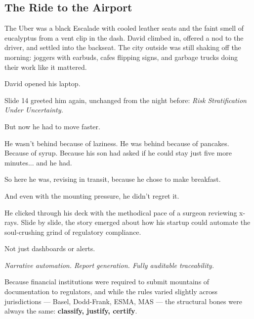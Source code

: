 
\subsection{The Ride to the Airport}

The Uber was a black Escalade with cooled leather seats and the faint smell of eucalyptus from a vent 
clip in the dash. David climbed in, offered a nod to the driver, and settled into the backseat. The 
city outside was still shaking off the morning: joggers with earbuds, cafes flipping signs, and garbage 
trucks doing their work like it mattered.

David opened his laptop.

Slide 14 greeted him again, unchanged from the night before:
\textit{Risk Stratification Under Uncertainty.}

But now he had to move faster.

He wasn’t behind because of laziness. He was behind because of pancakes. Because of syrup. 
Because his son had asked if he could stay just five more minutes... and he had.

So here he was, revising in transit, because he chose to make breakfast.

And even with the mounting pressure, he didn’t regret it.

He clicked through his deck with the methodical pace of a surgeon reviewing x-rays. Slide by slide, the story emerged
about how his startup could automate the soul-crushing grind of regulatory compliance.

Not just dashboards or alerts.

\textit{Narrative automation. Report generation. Fully auditable traceability.}

Because financial institutions were required to submit mountains of documentation to regulators, and while the 
rules varied slightly across jurisdictions — Basel, Dodd-Frank, ESMA, MAS — the structural bones were always the same:
\textbf{classify, justify, certify}.

\medskip

